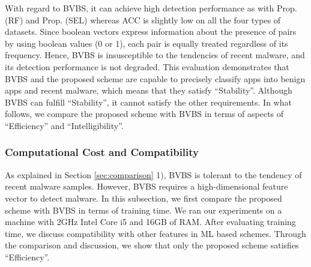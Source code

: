 \documentclass{ieeeaccess}
\begin{document}
With regard to BVBS, it can achieve high detection performance as with Prop. (RF) and Prop. (SEL) whereas ACC is slightly low on all the four types of datasets.
Since boolean vectors express information about the presence of pairs by using boolean values (0 or 1), each pair is equally treated regardless of its frequency.
Hence, BVBS is insusceptible to the tendencies of recent malware, and its detection performance is not degraded.
This evaluation demonstrates that BVBS and the proposed scheme are capable to precisely classify apps into benign apps and recent malware, which means that they satisfy ``Stability''.
Although BVBS can fulfill ``Stability'', it cannot satisfy the other requirements.
In what follows, we compare the proposed scheme with BVBS in terms of aspects of ``Efficiency'' and ``Intelligibility''.

\subsubsection{Computational Cost and Compatibility}
As explained in Section \ref{sec:comparison} 1), BVBS is tolerant to the tendency of recent malware samples.
However, BVBS requires a high-dimensional feature vector to detect malware.
In this subsection, we first compare the proposed scheme with BVBS in terms of training time.
We ran our experiments on a machine with 2GHz Intel Core i5 and 16GB of RAM.
After evaluating training time, we discuss compatibility with other features in ML based schemes.  
Through the comparison and discussion, we show that only the proposed scheme satisfies ``Efficiency''.
\end{document}

